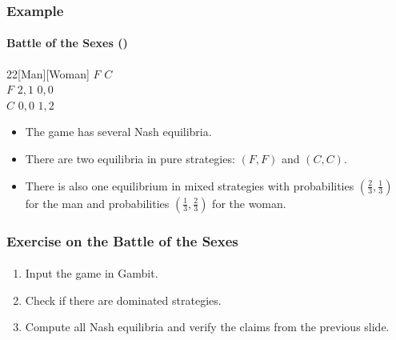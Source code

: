 \documentclass[10pt]{beamer}
\theoremstyle{definition}
\begin{document}
\begin{frame}[fragile]
\frametitle{Example }
\framesubtitle{Battle of the Sexes ()}
\begin{center}
\begin{game}{2}{2}[Man][Woman]
 \> $ F $ \> $ C $ \\
$ F $ \> $ 2,1 $ \> $ 0,0 $ \\
$ C $ \> $ 0,0 $ \> $ 1,2 $
\end{game}
\end{center}\bigskip

\begin{itemize}\itemsep1em
\item The game has several Nash equilibria.
\item There are two equilibria in pure strategies: $ (F,F) $ and $ (C,C) $.
\item There is also one equilibrium in mixed strategies with probabilities $ (\frac{2}{3},\frac{1}{3}) $ for the man and probabilities $ (\frac{1}{3},\frac{2}{3}) $ for the woman.
\end{itemize}
\end{frame}

\begin{frame}[fragile]
\frametitle{Exercise on the Battle of the Sexes}
\framesubtitle{}
\begin{enumerate}\itemsep1em
\item Input the game in Gambit.
\item Check if there are dominated strategies.
\item Compute all Nash equilibria and verify the claims from the previous slide.
\end{enumerate}
\end{frame}
\end{document}
